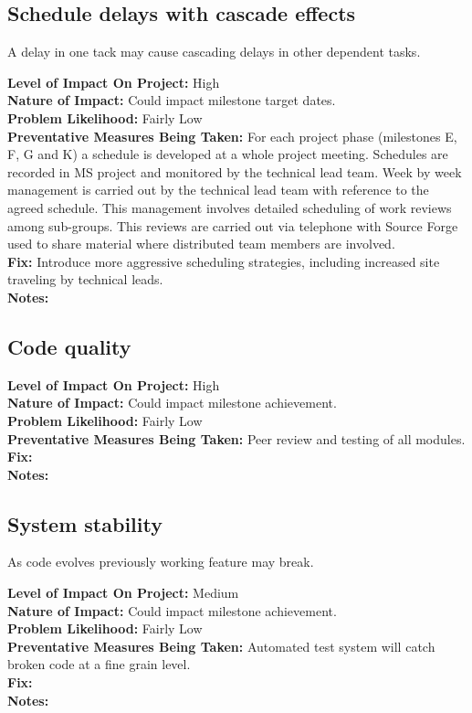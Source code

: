 \documentclass[english]{article}
\newcommand{\sreq}[1]{\subsection{\hspace{.2in}#1}}
\newenvironment
{reqlist}
{\begin{list} {} {} \rm \item[]}
{\end{list}}
\begin{document}
\sreq{Schedule delays with cascade effects}
A delay in one tack may cause cascading delays in other dependent tasks.
\begin{reqlist}
{\bf Level of Impact On Project:} High \\
{\bf Nature of Impact:} Could impact milestone target dates.\\
{\bf Problem Likelihood:} Fairly Low \\
{\bf Preventative Measures Being Taken:} For each project phase
(milestones E, F, G and K) a schedule is developed at a whole project meeting. 
Schedules are recorded in MS project and monitored by the technical lead team.
Week by week management is carried out by the technical lead team with reference to the
agreed schedule. This management involves detailed scheduling of
work reviews among sub-groups. This reviews are carried out via telephone
with Source Forge used to share material where distributed team members are
involved.  \\
{\bf Fix:} Introduce more aggressive scheduling strategies, including
increased site traveling by technical leads.\\
{\bf Notes:} 
\end{reqlist}

\sreq{Code quality}
\begin{reqlist}
{\bf Level of Impact On Project:} High \\
{\bf Nature of Impact:} Could impact milestone achievement.\\
{\bf Problem Likelihood:} Fairly Low \\
{\bf Preventative Measures Being Taken:} Peer review and testing of all modules.
\\
{\bf Fix:}\\
{\bf Notes:} 
\end{reqlist}

\sreq{System stability}
As code evolves previously working feature may break.
\begin{reqlist}
{\bf Level of Impact On Project:} Medium \\
{\bf Nature of Impact:} Could impact milestone achievement.\\
{\bf Problem Likelihood:} Fairly Low \\
{\bf Preventative Measures Being Taken:} Automated test system will catch 
broken code at a fine grain level.
\\
{\bf Fix:}\\
{\bf Notes:} 
\end{reqlist}
\end{document}
